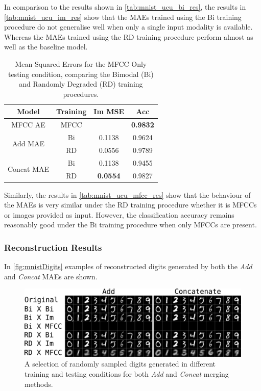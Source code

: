 In comparison to the results shown in \autoref{tab:mnist_ucu_bi_res}, the results in \autoref{tab:mnist_ucu_im_res} show that the MAEs trained using the Bi training procedure do not generalise well when only a single input modality is available. Whereas the MAEs trained using the RD training procedure perform almost as well as the baseline model. 
\begin{table}[h]
	\centering
		\begin{tabular}{|c|c|c|c|}
		\hline
		\textbf{Model} & \textbf{Training} & \textbf{Im MSE} &  \textbf{Acc} \\ \hline
				
				MFCC AE & MFCC & 					& 	\textbf{0.9832}	\\ \hline		
\multirow{2}{*}{Add MAE} & Bi & 	0.1138			& 	0.9624 			\\ \cline{2-4}
						  & RD &	0.0556			&	0.9789			\\ \hline	
		
\multirow{2}{*}{Concat MAE} & Bi &	0.1138			&	0.9455			\\ \cline{2-4}		
							 & RD & \textbf{0.0554}	& 	0.9827 			\\ \hline
		\end{tabular}
		\caption{Mean Squared Errors for the MFCC Only testing condition, comparing the Bimodal (Bi) and Randomly Degraded (RD) training procedures. }
		\label{tab:mnist_ucu_mfcc_res}

\end{table}

Similarly, the results in \autoref{tab:mnist_ucu_mfcc_res} show that the behaviour of the MAEs is very similar under the RD training procedure whether it is MFCCs or images provided as input. However, the classification accuracy remains reasonably good under the Bi training procedure when only MFCCs are present. 

\subsubsection{Reconstruction Results}

In \autoref{fig:mnistDigits} examples of reconstructed digits generated by both the \textit{Add} and \textit{Concat} MAEs are shown.

\begin{figure}[h]
\begin{center}
	\includegraphics[width=\textwidth]{Figs/mnistSpoken/lbAll.png}
	\caption{A selection of randomly sampled digits generated in different training and testing conditions for both \textit{Add} and \textit{Concat} merging methods.}
	\label{fig:mnistDigits}
\end{center}
\end{figure}

